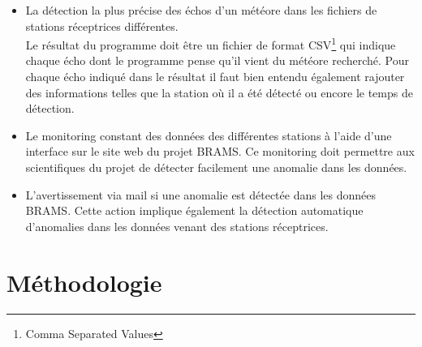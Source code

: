 \documentclass[11pt]{article}
\begin{document}
\begin{itemize}
    \item La détection la plus précise des échos d'un météore dans les fichiers de stations réceptrices différentes.\\
          Le résultat du programme doit être un fichier de format CSV\footnote{Comma Separated Values} qui indique chaque écho dont le programme pense qu'il vient du météore recherché.
          Pour chaque écho indiqué dans le résultat il faut bien entendu également rajouter des informations telles que la station où il a été détecté ou encore le temps de détection.
    \item Le monitoring constant des données des différentes stations à l'aide d'une interface sur le site web du projet BRAMS.
          Ce monitoring doit permettre aux scientifiques du projet de détecter facilement une anomalie dans les données.
    \item L'avertissement via mail si une anomalie est détectée dans les données BRAMS.
          Cette action implique également la détection automatique d'anomalies dans les données venant des stations réceptrices.
\end{itemize}

\newpage

\section{Méthodologie}
\end{document}
